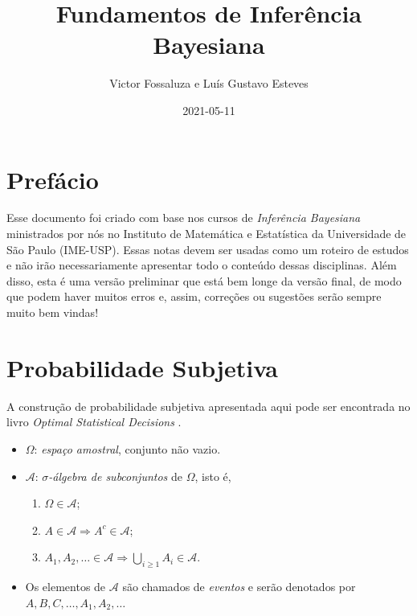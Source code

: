 \documentclass[
]{book}
\title{Fundamentos de Inferência Bayesiana}
\author{Victor Fossaluza e Luís Gustavo Esteves}
\date{2021-05-11}
\providecommand{\tightlist}{%
  \setlength{\itemsep}{0pt}\setlength{\parskip}{0pt}}
\begin{document}
\maketitle

{
\setcounter{tocdepth}{1}
\tableofcontents
}
\hypertarget{prefuxe1cio}{%
\chapter{Prefácio}\label{prefuxe1cio}}

Esse documento foi criado com base nos cursos de \emph{Inferência Bayesiana} ministrados por nós no Instituto de Matemática e Estatística da Universidade de São Paulo (IME-USP). Essas notas devem ser usadas como um roteiro de estudos e não irão necessariamente apresentar todo o conteúdo dessas disciplinas. Além disso, esta é uma versão preliminar que está bem longe da versão final, de modo que podem haver muitos erros e, assim, correções ou sugestões serão sempre muito bem vindas!

\hypertarget{ProbSubj}{%
\chapter{Probabilidade Subjetiva}\label{ProbSubj}}

A construção de probabilidade subjetiva apresentada aqui pode ser encontrada no livro \emph{Optimal Statistical Decisions} \citep{DeGroot70}.

\begin{itemize}
\item
  \(\Omega\): \emph{espaço amostral}, conjunto não vazio.
\item
  \(\mathcal{A}\): \emph{\(\sigma\)-álgebra de subconjuntos} de \(\Omega\), isto é,

  \begin{enumerate}
  \def\labelenumi{\arabic{enumi}.}
  \tightlist
  \item
    \(\Omega \in \mathcal{A}\);
  \item
    \(A \in \mathcal{A} \Longrightarrow A^{c} \in \mathcal{A}\);
  \item
    \(\displaystyle A_1, A_2, \ldots \in \mathcal{A} \Longrightarrow \bigcup_{i\geq1} A_i \in \mathcal{A}\).
  \end{enumerate}
\item
  Os elementos de \(\mathcal{A}\) são chamados de \emph{eventos} e serão denotados por \(A, B, C, \ldots, A_1, A_2, \ldots\)
\end{itemize}
\end{document}
